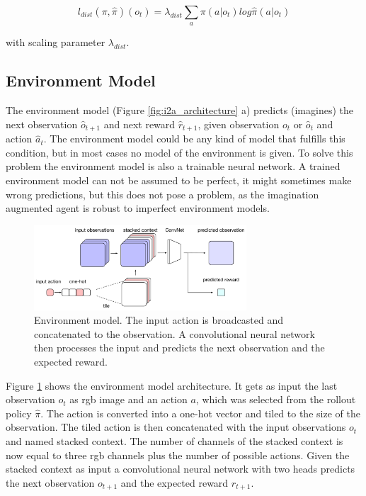 \begin{equation} 
    l_{dist}(\pi, \hat{\pi})(o_t) = \lambda_{dist} \sum_a \pi(a | o_t) log \hat{\pi}(a|o_t) 
\end{equation} 

with scaling parameter $\lambda_{dist}$.\\


\subsection{Environment Model}
\label{sec:env_model}

The environment model (Figure \ref{fig:i2a_architecture} a) predicts (imagines) the next observation $\hat{o}_{t+1}$ and next reward $\hat{r}_{t+1}$, given observation $o_t$ or $\hat{o}_t$ and action $\hat{a}_t$.
The environment model could be any kind of model that fulfills this condition, but in most cases no model of the environment is given.
To solve this problem the environment model is also a trainable neural network.
A trained environment model can not be assumed to be perfect, it might sometimes make wrong predictions, but this does not pose a problem, as the imagination augmented agent is robust to imperfect environment models.

   
\begin{figure}[H] 
  \centering 
   
  \includegraphics[width=300px]{./Images/i2a_env.pdf}
  \caption{Environment model. The input action is broadcasted and concatenated to the observation. A convolutional neural network then processes the input and predicts the next observation and the expected reward.} 
  \label{fig:environment_model_architecture} 
\end{figure} 

Figure \ref{fig:environment_model_architecture} shows the environment model architecture.
It gets as input the last observation $o_t$ as rgb image and an action $a$, which was selected from the rollout policy $\hat{\pi}$. The action is converted into a one-hot vector and tiled to the size of the observation.
The tiled action is then concatenated with the input observations $o_t$ and named stacked context.
The number of channels of the stacked context is now equal to three rgb channels plus the number of possible actions.
Given the stacked context as input a convolutional neural network with two heads predicts the next observation $o_{t+1}$ and the expected reward $r_{t+1}$.\\

